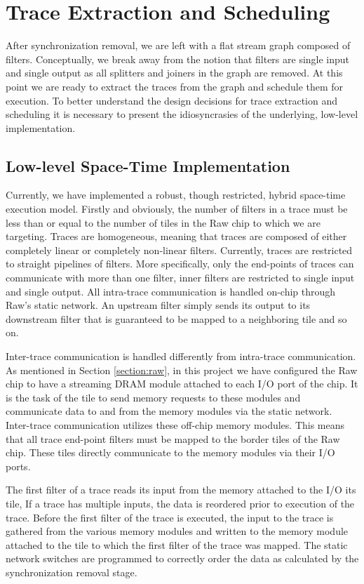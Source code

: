 \section{Trace Extraction and Scheduling}
\label{sec:traces}
After synchronization removal, we are left with a flat stream graph
composed of filters.  Conceptually, we break away from the notion that
filters are single input and single output as all splitters and
joiners in the graph are removed.  At this point we are ready to
extract the traces from the graph and schedule them for execution.  To
better understand the design decisions for trace extraction and
scheduling it is necessary to present the idiosyncrasies of the
underlying, low-level implementation.

\subsection{Low-level Space-Time Implementation}
Currently, we have implemented a robust, though restricted, hybrid
space-time execution model.  Firstly and obviously, the number of
filters in a trace must be less than or equal to the number of tiles
in the Raw chip to which we are targeting.  Traces are homogeneous,
meaning that traces are composed of either completely linear or
completely non-linear filters.  Currently, traces are restricted to
straight pipelines of filters.  More specifically, only the end-points
of traces can communicate with more than one filter, inner filters are
restricted to single input and single output.  All intra-trace
communication is handled on-chip through Raw's static network.  An
upstream filter simply sends its output to its downstream filter that
is guaranteed to be mapped to a neighboring tile and so on.

Inter-trace communication is handled differently from intra-trace
communication.  As mentioned in Section \ref{section:raw}, in this
project we have configured the Raw chip to have a streaming DRAM
module attached to each I/O port of the chip.  It is the task of the
tile to send memory requests to these modules and communicate data to
and from the memory modules via the static network.  Inter-trace
communication utilizes these off-chip memory modules.  This means that
all trace end-point filters must be mapped to the border tiles of the
Raw chip.  These tiles directly communicate to the memory modules via
their I/O ports.  

The first filter of a trace reads its input from the memory attached
to the I/O its tile, If a trace has multiple inputs, the data is
reordered prior to execution of the trace.  Before the
first filter of the trace is executed, the input to the trace is
gathered from the various memory modules and written to the memory
module attached to the tile to which the first filter of the trace was
mapped.  The static network switches are programmed to
correctly order the data as calculated by the synchronization removal
stage.

